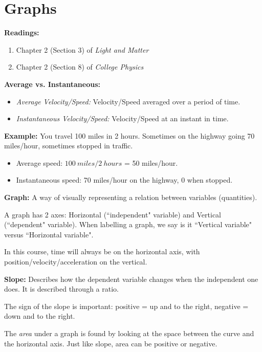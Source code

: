 \documentclass[12pt]{article}
\begin{document}
\section{Graphs}
	
\noindent \textbf{Readings:}
\begin{enumerate}
\item Chapter 2 (Section 3) of \textit{Light and Matter}
\item Chapter 2 (Section 8) of \textit{College Physics}
\end{enumerate}
	
\noindent \textbf{\large Average vs. Instantaneous:}
\begin{itemize}
	\item \textit{Average Velocity/Speed:}  Velocity/Speed averaged over a period of time.
	\item \textit{Instantaneous Velocity/Speed:} Velocity/Speed at an instant in time.
\end{itemize}

\textbf{Example:} You travel 100 miles in 2 hours. Sometimes on the highway going 70 miles/hour, sometimes stopped in traffic.
\begin{itemize}
	\item Average speed: $100~miles/2~hours$ = 50 miles/hour.
	\item Instantaneous speed: 70 miles/hour on the highway, 0 when stopped.
\end{itemize}
	
\noindent \textbf{\large Graph:} A way of visually representing a relation between variables (quantities).

A graph has 2 axes: Horizontal (``independent" variable) and Vertical (``dependent" variable). When labelling a graph, we say is it ``Vertical variable" versus ``Horizontal variable".

In this course, time will always be on the horizontal axis, with position/velocity/acceleration on the vertical.

\textbf{Slope:} Describes how the dependent variable changes when the independent one does. It is described through a ratio.
\begin{center}\end{center}

The sign of the slope is important: positive = up and to the right, negative = down and to the right.

The \textit{area} under a graph is found by looking at the space between the curve and the horizontal axis. Just like slope, area can be positive or negative.
\end{document}
